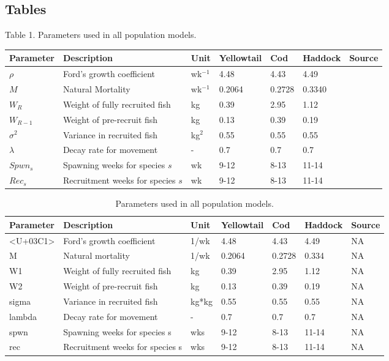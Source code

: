 \documentclass[
  12pt,
]{article}
\begin{document}
\pagebreak

\hypertarget{tables}{%
\subsection{Tables}\label{tables}}

\pagebreak

Table 1. Parameters used in all population models.

\begin{longtable}[]{@{}lllllll@{}}
\toprule
Parameter & Description & Unit & Yellowtail & Cod & Haddock & Source \\
\midrule
\endhead
\(\rho\) & Ford's growth coefficient & wk\(^{-1}\) & 4.48 & 4.43 & 4.49 & \\
\(M\) & Natural Mortality & wk\(^{-1}\) & 0.2064 & 0.2728 & 0.3340 & \\
\(W_R\) & Weight of fully recruited fish & kg & 0.39 & 2.95 & 1.12 & \\
\(W_{R-1}\) & Weight of pre-recruit fish & kg & 0.13 & 0.39 & 0.19 & \\
\(\sigma^2\) & Variance in recruited fish & kg\(^2\) & 0.55 & 0.55 & 0.55 & \\
\(\lambda\) & Decay rate for movement & - & 0.7 & 0.7 & 0.7 & \\
\(Spwn_s\) & Spawning weeks for species \(s\) & wk & 9-12 & 8-13 & 11-14 & \\
\(Rec_s\) & Recruitment weeks for species \(s\) & wk & 9-12 & 8-13 & 11-14 & \\
\bottomrule
\end{longtable}

\begin{table}
 
 \caption{\label{tab:paramsALL2}Parameters used in all population models.}
 \centering
 \fontsize{10}{12}\selectfont
 \begin{tabular}[t]{lllllll}
 \toprule
 Parameter & Description & Unit & Yellowtail & Cod & Haddock & Source\\
 \midrule
 <U+03C1> & Ford's growth coefficient & 1/wk & 4.48 & 4.43 & 4.49 & NA\\
 M & Natural mortality & 1/wk & 0.2064 & 0.2728 & 0.334 & NA\\
 W1 & Weight of fully recruited fish & kg & 0.39 & 2.95 & 1.12 & NA\\
 W2 & Weight of pre-recruit fish & kg & 0.13 & 0.39 & 0.19 & NA\\
 sigma & Variance in recruited fish & kg*kg & 0.55 & 0.55 & 0.55 & NA\\
 \addlinespace
 lambda & Decay rate for movement & - & 0.7 & 0.7 & 0.7 & NA\\
 spwn & Spawning weeks for species s & wks & 9-12 & 8-13 & 11-14 & NA\\
 rec & Recruitment weeks for species s & wks & 9-12 & 8-13 & 11-14 & NA\\
 \bottomrule
 \end{tabular}
 \end{table}
\end{document}
